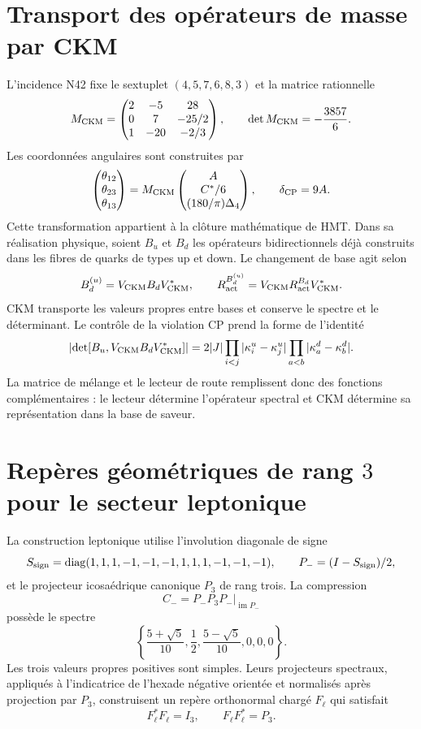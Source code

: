 \section{Transport des opérateurs de masse par CKM}
\label{sec:transporte-ckm-operadores-rev11}

L'incidence N42 fixe le sextuplet \((4,5,7,6,8,3)\) et la matrice rationnelle
\[
 M_{\rm CKM}=
 \begin{pmatrix}
 2&-5&28\\
 0&7&-25/2\\
 1&-20&-2/3
 \end{pmatrix},
 \qquad \det M_{\rm CKM}=-\frac{3857}{6}.
\]
Les coordonnées angulaires sont construites par
\[
 \begin{pmatrix}\theta_{12}\\\theta_{23}\\\theta_{13}\end{pmatrix}
 =M_{\rm CKM}
 \begin{pmatrix}A\\ C^*/6\\ (180/\pi)\Delta_4\end{pmatrix},
 \qquad \delta_{\rm CP}=9A.
\]
Cette transformation appartient à la clôture mathématique de HMT. Dans sa réalisation physique, soient \(B_u\) et \(B_d\) les opérateurs bidirectionnels déjà construits dans les fibres de quarks de types up et down. Le changement de base agit selon
\begin{equation}
 B_d^{(u)}=V_{\rm CKM}B_dV_{\rm CKM}^*,
 \qquad
 R_{\rm act}^{B_d^{(u)}}
 =V_{\rm CKM}R_{\rm act}^{B_d}V_{\rm CKM}^*.
 \label{eq:transporte-ckm-kappa-rev11}
\end{equation}
CKM transporte les valeurs propres entre bases et conserve le spectre et le déterminant. Le contrôle de la violation CP prend la forme de l'identité
\[
 \left|\det[B_u,V_{\rm CKM}B_dV_{\rm CKM}^*]\right|
 =2|J|\prod_{i<j}|\kappa_i^u-\kappa_j^u|
       \prod_{a<b}|\kappa_a^d-\kappa_b^d|.
\]
La matrice de mélange et le lecteur de route remplissent donc des fonctions complémentaires : le lecteur détermine l'opérateur spectral et CKM détermine sa représentation dans la base de saveur.

\section{Repères géométriques de rang \(3\) pour le secteur leptonique}
\label{sec:frames-pmns-rev11}

La construction leptonique utilise l'involution diagonale de signe
\[
 S_{\rm sign}=\operatorname{diag}(1,1,1,-1,-1,-1,1,1,1,-1,-1,-1),
 \qquad P_-=(I-S_{\rm sign})/2,
\]
et le projecteur icosaédrique canonique \(P_3\) de rang trois. La compression
\[
 C_-=P_-P_3P_-\big|_{\operatorname{im}P_-}
\]
possède le spectre
\[
 \left\{\frac{5+\sqrt5}{10},\frac12,
 \frac{5-\sqrt5}{10},0,0,0\right\}.
\]
Les trois valeurs propres positives sont simples. Leurs projecteurs spectraux, appliqués à l'indicatrice de l'hexade négative orientée et normalisés après projection par \(P_3\), construisent un repère orthonormal chargé \(F_\ell\) qui satisfait
\[
 F_\ell^*F_\ell=I_3,
 \qquad F_\ell F_\ell^*=P_3.
\]

